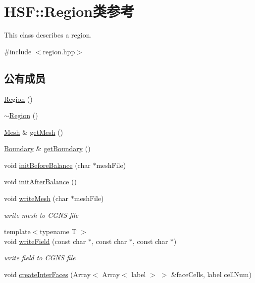 \hypertarget{classHSF_1_1Region}{
\section{HSF::Region类参考}
\label{classHSF_1_1Region}
}


This class describes a region.  


{\ttfamily \#include $<$region.hpp$>$}\subsection*{公有成员}
\begin{DoxyCompactItemize}
\item 
\hyperlink{classHSF_1_1Region_aa31738c265f5192d61a8a7b8f89c972a}{Region} ()
\item 
\hyperlink{classHSF_1_1Region_addfd3a382c30688582a760a25a2d8cbc}{$\sim$Region} ()
\item 
\hyperlink{classHSF_1_1Mesh}{Mesh} \& \hyperlink{classHSF_1_1Region_ab8349c21da1ed2153d3f0906dd571302}{getMesh} ()
\item 
\hyperlink{classHSF_1_1Boundary}{Boundary} \& \hyperlink{classHSF_1_1Region_aa887ee45c20b3b65acc17693d8cb4c45}{getBoundary} ()
\item 
void \hyperlink{classHSF_1_1Region_a9c38c5fc0d2fa5680eda4ab6a6933e4f}{initBeforeBalance} (char $\ast$meshFile)
\item 
void \hyperlink{classHSF_1_1Region_adb2b4937aae6fff73189a039b25eccfd}{initAfterBalance} ()
\item 
void \hyperlink{classHSF_1_1Region_a26f134480b539676bf18b26a96434c89}{writeMesh} (char $\ast$meshFile)
\begin{DoxyCompactList}\small\item\em write mesh to CGNS file \item\end{DoxyCompactList}\item 
{\footnotesize template$<$typename T $>$ }\\void \hyperlink{classHSF_1_1Region_a2298d4a70a05cfef042c077410c3c29b}{writeField} (const char $\ast$, const char $\ast$, const char $\ast$)
\begin{DoxyCompactList}\small\item\em write field to CGNS file \item\end{DoxyCompactList}\item 
void \hyperlink{classHSF_1_1Region_a39c7b59ebdc736618d652d53d1dace0b}{createInterFaces} (Array$<$ Array$<$ label $>$ $>$ \&faceCells, label cellNum)

\end{DoxyCompactItemize}
